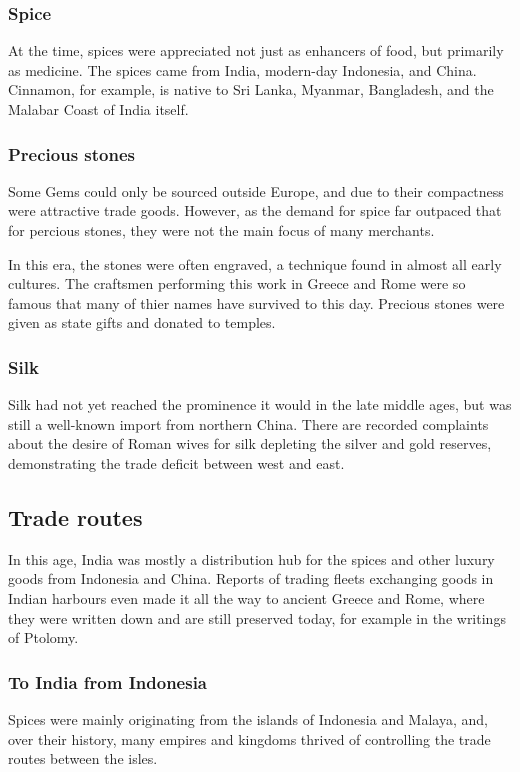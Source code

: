 \documentclass[11pt, a4paper, headings=standardclasses]{scrartcl}
\begin{document}
\subsubsection{Spice}
At the time, spices were appreciated not just as enhancers of food, but primarily as medicine\autocite{MST}. The spices came from India, modern-day Indonesia, and China. Cinnamon, for example, is native to Sri Lanka, Myanmar, Bangladesh, and the Malabar Coast of India itself\autocite{Cinnamon}.
\subsubsection{Precious stones}
Some Gems could only be sourced outside Europe, and due to their compactness were attractive trade goods. However, as the demand for spice far outpaced that for percious stones\autocite{Rome}, they were not the main focus of many merchants.

In this era, the stones were often engraved, a technique found in almost all early cultures. The craftsmen performing this work in Greece and Rome were so famous that many of thier names have survived to this day. Precious stones were given as state gifts and donated to temples.\autocite{RG}
\subsubsection{Silk}
Silk had not yet reached the prominence it would in the late middle ages, but was still a well-known import from northern China. There are recorded complaints about the desire of Roman wives for silk depleting the silver and gold reserves, demonstrating the trade deficit between west and east.\autocite[Chapter 13]{Rome}
\subsection{Trade routes}
In this age, India was mostly a distribution hub for the spices and other luxury goods from Indonesia and China. Reports of trading fleets exchanging goods in Indian harbours even made it all the way to ancient Greece and Rome, where they were written down and are still preserved today, for example in the writings of Ptolomy.\autocite[p.~148-150]{Rome}

\subsubsection{To India from Indonesia}

Spices were mainly originating from the islands of Indonesia and Malaya, and, over their history, many empires and kingdoms thrived of controlling the trade routes between the isles.\autocite{Indonesia}
\end{document}
